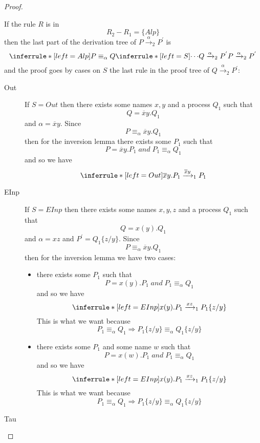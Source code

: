 \begin{theorem}
\begin{proof}
\begin{description}
\[{	  }
	\]
	If the rule $R$ is in 
	\[
	  R_{2}-R_{1}=\{Alp\}
	\]
	then the last part of the derivation tree of $P\xrightarrow{\alpha}_{2}P^{'}$ is
	\[
	  \inferrule* [left=Alp]{
	      P\equiv_{\alpha}Q
	    \\
	      \inferrule* [left=S]{
		\cdots
	      }{
		Q\xrightarrow{\alpha}_{2}P^{'}
	      }
	  }{
	    P\xrightarrow{\alpha}_{2}P^{'}
	  }
	\]
	and the proof goes by cases on $S$ the last rule in the proof tree of $Q\xrightarrow{\alpha}_{2}P^{'}$:
	\begin{description}
	  \item[Out]
	    If $S=Out$ then there exists some names $x,y$ and a process $Q_{1}$ such that 
	    \[
	      Q=\overline{x}y.Q_{1}
	    \]
	    and $\alpha=\overline{x}y$. Since 
	    \[
	      P\equiv_{\alpha}\overline{x}y.Q_{1}
	    \]
	    then for the inversion lemma there exists some $P_{1}$ such that 
	    \[
	      P=\overline{x}y.P_{1}\; and\; P_{1}\equiv_{\alpha}Q_{1}
	    \]
	    and so we have
	    \[
	      \inferrule* [left=Out]{
	      }{
		\overline{x}y.P_{1}\xrightarrow{\overline{x}y}_{1}P_{1}
	      }
	    \]
	  \item[EInp]
	    If $S=EInp$ then there exists some names $x,y,z$ and a process $Q_{1}$ such that 
	    \[
	      Q=x(y).Q_{1}
	    \]
	    and $\alpha=xz$ and $P^{'}=Q_{1}\{z/y\}$. Since 
	    \[
	      P\equiv_{\alpha}\overline{x}y.Q_{1}
	    \]
	    then for the inversion lemma we have two cases:
	    \begin{itemize}
	      \item 
		there exists some $P_{1}$ such that 
		\[
		  P=x(y).P_{1}\; and\; P_{1}\equiv_{\alpha}Q_{1}
		\]
		and so we have
		\[
		  \inferrule* [left=EInp]{
		  }{
		    x(y).P_{1}\xrightarrow{xz}_{1}P_{1}\{z/y\}
		  }
		\]
		This is what we want because 
		\[
		  P_{1}\equiv_{\alpha}Q_{1}\Rightarrow P_{1}\{z/y\}\equiv_{\alpha}Q_{1}\{z/y\}
		\]
	      \item
		there exists some $P_{1}$ and some name $w$ such that 
		\[
		  P=x(w).P_{1}\; and\; P_{1}\equiv_{\alpha}Q_{1}
		\]
		and so we have
		\[
		  \inferrule* [left=EInp]{
		  }{
		    x(y).P_{1}\xrightarrow{xz}_{1}P_{1}\{z/y\}
		  }
		\]
		This is what we want because 
		\[
		  P_{1}\equiv_{\alpha}Q_{1}\Rightarrow P_{1}\{z/y\}\equiv_{\alpha}Q_{1}\{z/y\}
		\]		
	    \end{itemize}
	  \item[Tau]
	\end{description}
    \end{description}
  \end{proof}
\end{theorem}


